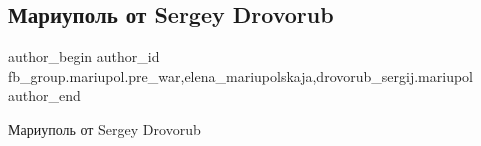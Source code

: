  
 
 
 
 

\subsection{Мариуполь от Sergey Drovorub}
\label{sec:09_02_2023.fb.fb_group.mariupol.pre_war.1.mariupol_ot_sergey_d}
 
\ifcmt
 author_begin
   author_id fb_group.mariupol.pre_war,elena_mariupolskaja,drovorub_sergij.mariupol
 author_end
\fi

Мариуполь от Sergey Drovorub

